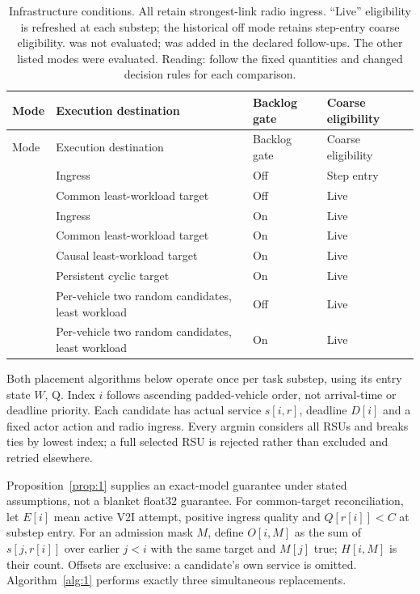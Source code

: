 \documentclass[12pt,a4paper]{article}
\begin{document}
\begingroup
\singlespacing\footnotesize\setlength{\tabcolsep}{3pt}
\renewcommand{\thetable}{3}
\begin{xltabular}{\textwidth}{@{}YYYY@{}}
\caption[Infrastructure conditions]{Infrastructure conditions. All retain strongest-link radio ingress. ``Live'' eligibility is refreshed at each substep; the historical off mode retains step-entry coarse eligibility.  was not evaluated;  was added in the declared follow-ups. The other listed modes were evaluated. Reading: follow the fixed quantities and changed decision rules for each comparison.}\label{tab:3} \\
\toprule
Mode & Execution destination & Backlog gate & Coarse eligibility \\
\midrule\endfirsthead
\toprule
Mode & Execution destination & Backlog gate & Coarse eligibility \\
\midrule\endhead
\bottomrule\endfoot
{} & Ingress & Off & Step entry \\
 & Common least-workload target & Off & Live \\
 & Ingress & On & Live \\
 & Common least-workload target & On & Live \\
 & Causal least-workload target & On & Live \\
 & Persistent cyclic target & On & Live \\
 & Per-vehicle two random candidates, least workload & Off & Live \\
 & Per-vehicle two random candidates, least workload & On & Live \\
\end{xltabular}
\endgroup

Both placement algorithms below operate once per task substep, using its entry state $W$, Q. Index $i$ follows ascending padded-vehicle order, not arrival-time or deadline priority. Each candidate has actual service $s[i,r]$, deadline $D[i]$ and a fixed actor action and radio ingress. Every argmin considers all RSUs and breaks ties by lowest index; a full selected RSU is rejected rather than excluded and retried elsewhere.

Proposition~\ref{prop:1} supplies an exact-model guarantee under stated assumptions, not a blanket float32 guarantee. For common-target reconciliation, let $E[i]$ mean active V2I attempt, positive ingress quality and $Q[r[i]]<C$ at substep entry. For an admission mask $M$, define $O[i,M]$ as the sum of $s[j,r[i]]$ over earlier $j<i$ with the same target and $M[j]$ true; $H[i,M]$ is their count. Offsets are exclusive: a candidate's own service is omitted. Algorithm~\ref{alg:1} performs exactly three simultaneous replacements.
\end{document}

